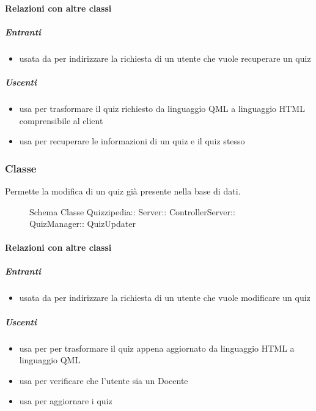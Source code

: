 \paragraph{Relazioni con altre classi}
\subparagraph{Entranti}
\begin{itemize}
\item usata da  per indirizzare la richiesta di un utente che vuole recuperare un quiz
\end{itemize}
\subparagraph{Uscenti}
\begin{itemize}
\item usa  per trasformare il quiz richiesto da linguaggio QML a linguaggio HTML comprensibile al client
\item usa  per recuperare le informazioni di un quiz e il quiz stesso
\end{itemize}
\subsubsection{Classe }
Permette la modifica di un quiz già presente nella base di dati.
\begin{figure}[H]
\centering
\noindent{}
\caption[Schema Classe QuizUpdater]{Schema Classe Quizzipedia:: Server:: ControllerServer:: QuizManager:: QuizUpdater}
\end{figure}
\paragraph{Relazioni con altre classi}
\subparagraph{Entranti}
\begin{itemize}
\item usata da  per indirizzare la richiesta di un utente che vuole modificare un quiz
\end{itemize}
\subparagraph{Uscenti}
\begin{itemize}
\item usa  per per trasformare il quiz appena aggiornato da linguaggio HTML a linguaggio QML
\item usa  per verificare che l'utente sia un Docente
\item usa  per aggiornare i quiz
\end{itemize}
